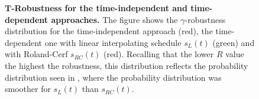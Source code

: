 \begin{figure}[ht]
  \centering
  \caption[Robustness for the time-independent hamiltonian]{\textbf{$\bm{T}$-Robustness for the time-independent and time-dependent approaches.} The figure shows the $\gamma$-robustness distribution for the time-independent approach (red), the time-dependent one with linear interpolating schedule $s_L(t)$ (green) and with Roland-Cerf $s_{RC}(t)$ (red). Recalling that the lower $R$ value the highest the robustness, this distribution reflects the probability distribution seen in , where the probability distribution was smoother for $s_L(t)$ than $s_{RC}(t)$.}
  \label{fig:time_robustness}
\end{figure}
